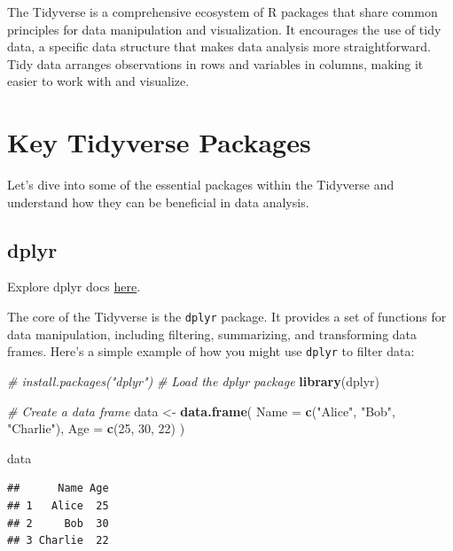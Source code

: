 \documentclass[
]{book}
\newenvironment{Shaded}{\begin{snugshade}}{\end{snugshade}}
\newcommand{\AttributeTok}[1]{\textcolor[rgb]{0.13,0.29,0.53}{#1}}
\newcommand{\CommentTok}[1]{\textcolor[rgb]{0.56,0.35,0.01}{\textit{#1}}}
\newcommand{\DecValTok}[1]{\textcolor[rgb]{0.00,0.00,0.81}{#1}}
\newcommand{\FunctionTok}[1]{\textcolor[rgb]{0.13,0.29,0.53}{\textbf{#1}}}
\newcommand{\NormalTok}[1]{#1}
\newcommand{\OtherTok}[1]{\textcolor[rgb]{0.56,0.35,0.01}{#1}}
\newcommand{\StringTok}[1]{\textcolor[rgb]{0.31,0.60,0.02}{#1}}
\begin{document}
The Tidyverse is a comprehensive ecosystem of R packages that share common principles for data manipulation and visualization. It encourages the use of tidy data, a specific data structure that makes data analysis more straightforward. Tidy data arranges observations in rows and variables in columns, making it easier to work with and visualize.

\hypertarget{key-tidyverse-packages}{%
\section{Key Tidyverse Packages}\label{key-tidyverse-packages}}

Let's dive into some of the essential packages within the Tidyverse and understand how they can be beneficial in data analysis.

\hypertarget{dplyr}{%
\subsection{dplyr}\label{dplyr}}

Explore dplyr docs \href{https://dplyr.tidyverse.org/}{here}.

The core of the Tidyverse is the \texttt{dplyr} package. It provides a set of functions for data manipulation, including filtering, summarizing, and transforming data frames. Here's a simple example of how you might use \texttt{dplyr} to filter data:

\begin{Shaded}
\begin{Highlighting}[]
\CommentTok{\# install.packages("dplyr")}
\CommentTok{\# Load the dplyr package}
\FunctionTok{library}\NormalTok{(dplyr)}

\CommentTok{\# Create a data frame}
\NormalTok{data }\OtherTok{\textless{}{-}} \FunctionTok{data.frame}\NormalTok{(}
  \AttributeTok{Name =} \FunctionTok{c}\NormalTok{(}\StringTok{"Alice"}\NormalTok{, }\StringTok{"Bob"}\NormalTok{, }\StringTok{"Charlie"}\NormalTok{),}
  \AttributeTok{Age =} \FunctionTok{c}\NormalTok{(}\DecValTok{25}\NormalTok{, }\DecValTok{30}\NormalTok{, }\DecValTok{22}\NormalTok{)}
\NormalTok{)}

\NormalTok{data }
\end{Highlighting}
\end{Shaded}

\begin{verbatim}
##      Name Age
## 1   Alice  25
## 2     Bob  30
## 3 Charlie  22
\end{verbatim}
\end{document}
